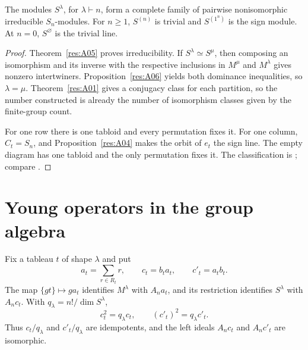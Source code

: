 \begin{theorem}
\label{res:A07}
The modules \(S^\lambda\), for \(\lambda\vdash n\), form a complete
family of pairwise nonisomorphic irreducible \(S_n\)-modules.
For \(n\geq 1\), \(S^{(n)}\) is trivial and \(S^{(1^n)}\) is the
sign module. At \(n=0\), \(S^\varnothing\) is the trivial line.
\end{theorem}

\begin{proof}
Theorem~\ref{res:A05} proves irreducibility. If
\(S^\lambda\simeq S^\mu\), then composing an isomorphism and its
inverse with the respective inclusions in \(M^\mu\) and \(M^\lambda\)
gives nonzero intertwiners. Proposition~\ref{res:A06} yields both
dominance inequalities, so \(\lambda=\mu\).
Theorem~\ref{res:A01} gives a conjugacy class for each partition,
so the number constructed is already the number of isomorphism
classes given by the finite-group count.

For one row there is one tabloid and every permutation fixes it.
For one column, \(C_t=S_n\), and Proposition~\ref{res:A04} makes
the orbit of \(e_t\) the sign line. The empty diagram has one tabloid
and the only permutation fixes it. The classification is
\cite[\S2.4, Theorem 2.4.6]{sagan}; compare
\cite[\S4.12, Theorem 4.36]{etingof}.
\end{proof}

\section{Young operators in the group algebra}

\begin{proposition}
\label{res:A08}
Fix a tableau \(t\) of shape \(\lambda\) and put
\[
  a_t=\sum_{r\in R_t}r,\qquad c_t=b_t a_t,\qquad c'_t=a_t b_t .
\]
The map \(\{gt\}\mapsto ga_t\) identifies \(M^\lambda\) with
\(A_n a_t\), and its restriction identifies \(S^\lambda\) with
\(A_n c_t\). With \(q_\lambda=n!/\dim S^\lambda\),
\[
  c_t^2=q_\lambda c_t,\qquad (c'_t)^2=q_\lambda c'_t .
\]
Thus \(c_t/q_\lambda\) and \(c'_t/q_\lambda\) are idempotents, and
the left ideals \(A_n c_t\) and \(A_n c'_t\) are isomorphic.
\end{proposition}

